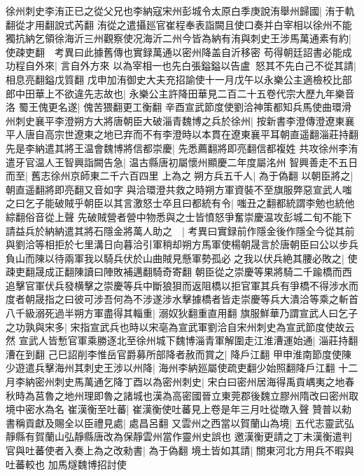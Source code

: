 徐州刺史李洧正已之從父兄也李納寇宋州彭城令太原白季庚說洧舉州歸國|{
	洧于軌翻從才用翻說式芮翻}
洧從之遣攝廵官崔程奉表詣闕且使口奏并白宰相以徐州不能獨抗納乞領徐海沂三州觀察使况海沂二州今皆為納有洧與刺史王涉馬萬通素有約|{
	使疎吏翻　考異曰此據舊傳也實録萬通以密州降盖自沂移密}
苟得朝廷詔書必能成功程自外來|{
	言自外方來}
以為宰相一也先白張鎰鎰以告盧怒其不先白己不從其請|{
	相息亮翻鎰戊質翻}
戊申加洧御史大夫充招諭使十一月戊午以永樂公主適檢校比部郎中田華上不欲違先志故也|{
	永樂公主許降田華見二百二十五卷代宗大歷九年樂音洛}
蜀王傀更名遂|{
	傀苦猥翻更工衡翻}
辛酉宣武節度使劉洽神策都知兵馬使曲環滑州刺史襄平李澄朔方大將唐朝臣大破淄青魏博之兵於徐州|{
	按新書李澄傳澄遼東襄平人唐自高宗世遼東之地已弃而不有李澄時以本貫在遼東襄平耳朝直遥翻淄莊持翻}
先是李納遣其將王温會魏博將信都崇慶|{
	先悉薦翻將即亮翻信都複姓}
共攻徐州李洧遣牙官温人王智興詣闕告急|{
	温古縣唐初屬懷州顯慶二年度屬洺州}
智興善走不五日而至|{
	舊志徐州京師東二千六百四里}
上為之朔方兵五千人|{
	為于偽翻}
以朝臣將之|{
	朝直遥翻將即亮翻又音如字}
與洽環澄共救之時朔方軍資裝不至旗服弊惡宣武人嗤之曰乞子能破賊乎朝臣以其言激怒士卒且曰都統有令|{
	嗤丑之翻都統謂李勉也統他綜翻俗音從上聲}
先破賊營者營中物悉與之士皆憤怒爭奮崇慶温攻彭城二旬不能下請益兵於納納遣其將石隱金將萬人助之　|{
	考異曰實録前作隱金後作隱全今從其前}
與劉洽等相拒於七里溝日向暮洽引軍稍却朔方馬軍使楊朝晟言於唐朝臣曰公以步兵負山而陳以待兩軍我以騎兵伏於山曲賊見懸軍勢孤必之我以伏兵絶其腰必敗之|{
	使疎吏翻晟成正翻陳讀曰陣敗補邁翻騎奇寄翻}
朝臣從之崇慶等果將騎二千踰橋而西追擊官軍伏兵發横擊之崇慶等兵中斷狼狽而返阻橋以拒官軍其兵有爭橋不得涉水而度者朝晟指之曰彼可涉吾何為不涉遂涉水擊據橋者皆走崇慶等兵大潰洽等乘之斬首八千級溺死過半朔方軍盡得其輜重|{
	溺奴狄翻重直用翻}
旗服鮮華乃謂宣武人曰乞子之功孰與宋多|{
	宋指宣武兵也時以宋亳為宣武軍劉洽自宋州刺史為宣武節度使故云然}
宣武人皆慙官軍乘勝逐北至徐州城下魏博淄青軍解圍走江淮漕運始通|{
	淄莊持翻漕在到翻}
己巳詔削李惟岳官爵募所部降者赦而賞之|{
	降戶江翻}
甲申淮南節度使陳少遊遣兵擊海州其刺史王涉以州降|{
	海州李納廵屬使疏吏翻少始照翻降戶江翻}
十二月李納密州刺史馬萬通乞降丁酉以為密州刺史|{
	宋白曰密州居海得禹貢嵎夷之地春秋時為莒魯之地州理即魯之諸城也漢為高密國晉立東莞郡後魏立膠州隋改曰密州取境中密水為名}
崔漢衡至吐蕃|{
	崔漢衡使吐蕃見上卷是年三月吐從暾入聲}
贊普以勑書稱貢獻及賜全以臣禮見處|{
	處昌呂翻}
又雲州之西當以賀蘭山為境|{
	五代志靈武弘靜縣有賀蘭山弘靜縣唐改為保靜雲州當作靈州史誤也}
邀漢衡更請之丁未漢衡遣判官與吐蕃使者入奏上為之改勑書|{
	為于偽翻}
境土皆如其請|{
	關東河北方用兵不暇與吐蕃較也}
加馬燧魏博招討使

